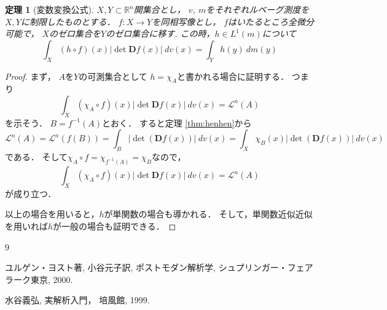\documentclass[leqno, a4paper, 12pt]{jsarticle}
\newtheorem{thm}{定理}
\newcommand{\rr}{\mathbb{R}}
\newcommand{\ddd}{\mathbf{D}}
\begin{document}
\begin{thm}[変数変換公式]
$X, Y\subset \rr^n$開集合とし，
$v$, $m$をそれぞれルベーグ測度を$X,Y$に制限したものとする．
$f:X\to Y$を同相写像とし，
$f$はいたるところ全微分可能で，
$X$のゼロ集合を$Y$のゼロ集合に移す.
この時，$h\in L^1(m)$について
\[
\int_{X}(h\circ f)(x)|\det \ddd f(x)|\ dv(x)=\int_{Y}h(y)\ dm(y)
\]
\end{thm}
\begin{proof}
まず，
$A$を$Y$の可測集合として
$h=\chi_{A}$と書かれる場合に証明する．
つまり
\[
\int_{X}(\chi_{A}\circ f)(x)|\det \ddd f(x)|\ dv(x)=\mathcal{L}^{n}(A)
\]
を示そう．
$B=f^{-1}(A)$とおく．
すると定理 \ref{thm:henhen}から
\[
\mathcal{L}^{n}(A)=\mathcal{L}^{n}(f(B))
=\int_{B}|\det(\ddd f(x))|\ dv(x)
=\int_{X}\chi_{B}(x)|\det(\ddd f(x))|\ dv(x)
\]
である．
そして$\chi_{A}\circ f=\chi_{f^{-1}(A)}=\chi_{B}$なので，
\[
\int_{X}(\chi_{A}\circ f)(x)|\det \ddd f(x)|\ dv(x)=\mathcal{L}^{n}(A)
\]
が成り立つ．

以上の場合を用いると，$h$が単関数の場合も導かれる．
そして，単関数近似近似を用いれば$h$が一般の場合も証明できる．
\end{proof}














	
\begin{thebibliography}{9}

ユルゲン・ヨスト著, 
小谷元子訳,
ポストモダン解析学, 
シュプリンガー・フェアラーク東京, 
2000. 


水谷義弘, 
実解析入門，
培風館, 
1999. 
\end{thebibliography}




			
\end{document}
